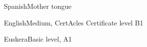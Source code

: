 \begin{lang}{Spanish}{Mother tongue}
\end{lang}

\begin{lang}{English}{Medium, CertAcles Certificate level B1}
\end{lang}

\begin{lang}{Euskera}{Basic level, A1}
\end{lang}